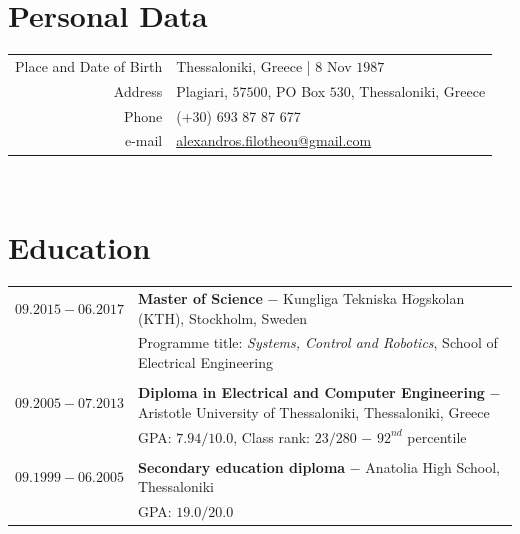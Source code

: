 \documentclass[a4paper,10pt,twoside]{article}
\begin{document}


\par{\bigskip\par}

\section{Personal Data}

\begin{tabular}{rp{10cm}}
Place and Date of Birth 	& Thessaloniki, Greece | $8$ Nov $1987$ \\
Address            			  & Plagiari, $57500$, PO Box $530$, Thessaloniki, Greece \\
Phone						          & (+30) 693 87 87 677 \\
e-mail                    & \href{mailto:alexandros.filotheou@gmail.com}{alexandros.filotheou@gmail.com}
\end{tabular}\\


\section{Education}

\begin{tabular}{rp{11cm}}
$09.2015 - 06.2017$ & \textbf{Master of Science} $-$ Kungliga Tekniska H$\ddot{o}$gskolan (KTH), Stockholm, Sweden\\
             & Programme title: \textit{Systems, Control and Robotics}, School of Electrical Engineering \\

&\\
$09.2005 - 07.2013$ & \textbf{Diploma in Electrical and Computer Engineering} $-$ Aristotle University of Thessaloniki, Thessaloniki, Greece \\
                    & GPA: $7.94 / 10.0$, Class rank: $23 / 280$ $-$ $92^{nd}$ percentile \\
&\\
$09.1999 - 06.2005$ & \textbf{Secondary education diploma} $-$ Anatolia High School, Thessaloniki \\
                    & GPA: $19.0 / 20.0$ \\
\end{tabular}\\
\end{document}
